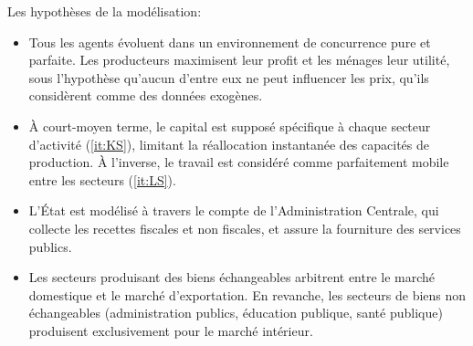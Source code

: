 \documentclass[11pt,a4paper]{article}
\begin{document}
	Les hypothèses de la modélisation:
	\begin{itemize}
		\item Tous les agents évoluent dans un environnement de concurrence pure et parfaite. Les producteurs maximisent leur profit et les ménages leur utilité, sous l'hypothèse qu'aucun d'entre eux ne peut influencer les prix, qu'ils considèrent comme des données exogènes.
		
		
		\item À court-moyen terme, le capital est supposé spécifique à chaque secteur d'activité (\ref{it:KS}), limitant la réallocation instantanée des capacités de production. À l'inverse, le travail est considéré comme parfaitement mobile entre les secteurs (\ref{it:LS}).
		
		
		\item L'État est modélisé à travers le compte de l'Administration Centrale, qui collecte les recettes fiscales et non fiscales, et assure la fourniture des services publics.
		
		
		\item  Les secteurs produisant des biens échangeables arbitrent entre le marché domestique et le marché d'exportation. En revanche, les secteurs de biens non échangeables (administration publics, éducation publique, santé publique) produisent exclusivement pour le marché intérieur.
	\end{itemize} 
	
\end{document}
